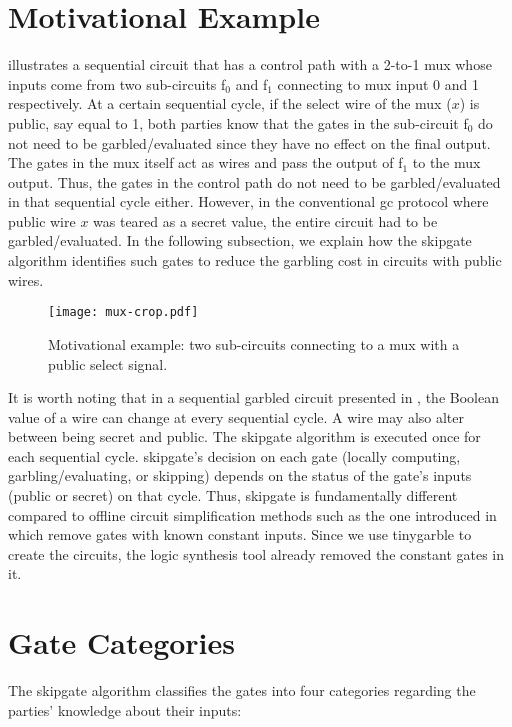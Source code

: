 \section{Motivational Example}\label{sec:skipgate-motiv}
 illustrates a sequential circuit that has a control path with a 2-to-1 \acrfull{mux} whose inputs come from two sub-circuits f$_0$ and f$_1$ connecting to \acrshort{mux} input 0 and 1 respectively.
At a certain sequential cycle, if the select wire of the \acrshort{mux} ($x$) is public, say equal to 1, both parties know that the gates in the sub-circuit f$_0$ do not need to be garbled/evaluated since they have no effect on the final output.
The gates in the \acrshort{mux} itself act as wires and pass the output of f$_1$ to the \acrshort{mux} output.
Thus, the gates in the control path do not need to be garbled/evaluated in that sequential cycle either.
However, in the conventional \acrshort{gc} protocol where public wire $x$ was teared as a secret value, the entire circuit had to be garbled/evaluated.
In the following subsection, we explain how the \gls{skipgate} algorithm identifies such gates to reduce the garbling cost in circuits with public wires.

\begin{figure}
    \centering
    \texttt{[image: mux-crop.pdf]}
    \caption{Motivational example: two sub-circuits connecting to a \acrshort{mux} with a public select signal.}
\label{fig:mux}
\end{figure}

It is worth noting that in a sequential garbled circuit presented in , the Boolean value of a wire can change at every sequential cycle.
A wire may also alter between being secret and public.
The \gls{skipgate} algorithm is executed once for each sequential cycle.
\gls{skipgate}'s decision on each gate (locally computing, garbling/evaluating, or skipping) depends on the status of the gate's inputs (public or secret) on that cycle.
Thus, \gls{skipgate} is fundamentally different compared to offline circuit simplification methods such as the one introduced in~\cite{pinkas2009secure} which remove gates with known constant inputs.
Since we use \gls{tinygarble} to create the circuits, the logic synthesis tool already removed the constant gates in it.

\section{Gate Categories}\label{sec:skipgate-cat}
The \gls{skipgate} algorithm classifies the gates into four categories regarding the parties' knowledge about their inputs:

